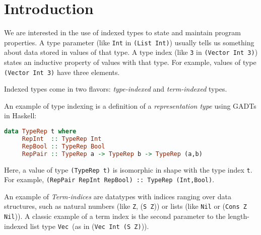 \section{Introduction}


We are interested in the use of indexed types to state and
maintain program properties. A type parameter
(like {\tt Int} in {\tt (List Int)}) usually tells us
something about data stored in values of that type.
A type index (like {\tt 3} in {\tt (Vector Int 3)}) states
an inductive property of values with that type. For example,
values of type {\tt (Vector Int 3)} have three elements.

Indexed types come in two flavors: \emph{type-indexed} and \emph{term-indexed}
types. 


An example of type indexing is a definition of a \emph{representation type}
\cite{Crary98} using GADTs in Haskell:\vspace*{-2pt}
\begin{lstlisting}[basicstyle={\ttfamily\small},language=Haskell,mathescape]
   data TypeRep t where
     RepInt  :: TypeRep Int
     RepBool :: TypeRep Bool
     RepPair :: TypeRep a -> TypeRep b -> TypeRep (a,b)
\end{lstlisting}\vspace*{-2pt}
Here, a value of type {\tt\small (TypeRep t)} is isomorphic in shape with
the type index {\tt t}. For example,
{\tt (RepPair RepInt RepBool) :: TypeRep (Int,Bool)}.


An example of {\it Term-indices} are datatypes with
indices ranging over data structures, such as natural numbers
(like {\tt Z}, {(\tt S Z})) or lists (like {\tt Nil} or ({\tt Cons Z Nil})). 
A classic example of a term index is the second parameter to
the length-indexed list type {\tt Vec}~(as in ({\tt Vec Int (S Z)})).

